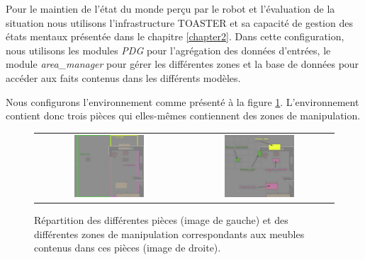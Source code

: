 \documentclass[a4paper,11pt,twoside]{StyleThese}
\begin{document}
Pour le maintien de l'état du monde perçu par le robot et l'évaluation de la situation nous utilisons l'infrastructure TOASTER et sa capacité de gestion des états mentaux présentée dans le chapitre \ref{chapter2}.
Dans cette configuration, nous utilisons les modules \textit{PDG} pour l'agrégation des données d'entrées, le module \textit{area\_manager} pour gérer les différentes zones et la base de données pour accéder aux faits contenus dans les différents modèles.

Nous configurons l'environnement comme présenté à la figure \ref{fig:areasMardi}.
L'environnement contient donc trois pièces qui elles-mêmes contiennent des zones de manipulation.

\begin{figure}[ht!]
 \centering
 \begin{tabular}{cc}
  \includegraphics[width=0.49\textwidth]{img/areas.jpg} &
  \includegraphics[width=0.49\textwidth]{img/furnitures.jpg}
 \end{tabular}
 \caption{Répartition des différentes pièces (image de gauche) et des différentes zones de manipulation correspondants aux meubles contenus dans ces pièces (image de droite).}
 \label{fig:areasMardi}
 \end{figure}
\end{document}
